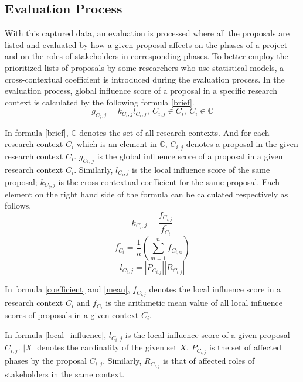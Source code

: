 \subsection{Evaluation Process}
With this captured data, an evaluation is processed where all the proposals are listed and evaluated by how a given proposal affects on the phases of a project and on the roles of stakeholders in corresponding phases. To better employ the prioritized lists of proposals by some researchers who use statistical models, a cross-contextual coefficient is introduced during the evaluation process. In the evaluation process, global influence score of a proposal in a specific research context is calculated by the following formula \ref{brief}.
\begin{equation}
g_{C_{i},j} = \mathit{k_{C_{i},j}}l_{C_{i},j},\ C_{i,j} \in C_{i},\ C_{i} \in \mathbb{C}
\label{brief}
\end{equation}

In formula \ref{brief}, $\mathbb{C}$ denotes the set of all research contexts. And for each research context $C_{i}$ which is an element in $\mathbb{C}$, $C_{i,j}$ denotes a proposal in the given research context $C_{i}$. $g_{Ci,j}$ is the global influence score of a proposal in a given research context $C_{i}$. Similarly, $l_{C_{i},j}$ is the local influence score of the same proposal; $\mathit{k_{C_{i},j}}$ is the cross-contextual coefficient for the same proposal. Each element on the right hand side of the formula can be calculated respectively as follows.
\begin{equation}
\mathit{k_{C_{i},j}} = \frac{f_{C_{i,j}}}{\bar{f_{C_i}}}
\label{coefficient}
\end{equation}
\begin{equation}
\bar{f_{C_i}} = \frac{1}{n}\left (\sum_{m=1}^n{f_{C_{i,m}}}\right)
\label{mean}
\end{equation}
\begin{equation}
l_{C_{i},j} = |P_{C_{i,j}}||R_{C_{i,j}}|
\label{local_influence}
\end{equation}

In formula \ref{coefficient} and \ref{mean}, $f_{C_{i,j}}$ denotes the local influence score in a research context $C_{i}$ and $\bar{f_{C_i}}$ is the arithmetic mean value of all local influence scores of proposals in a given context $C_{i}$.

In formula \ref{local_influence}, $l_{C_{i},j}$ is the local influence score of a given proposal $C_{i,j}$. $|X|$ denotes the cardinality of the given set $X$. $P_{C_{i,j}}$ is the set of affected phases by the proposal $C_{i,j}$. Similarly, $R_{C_{i,j}}$ is that of affected roles of stakeholders in the same context.


